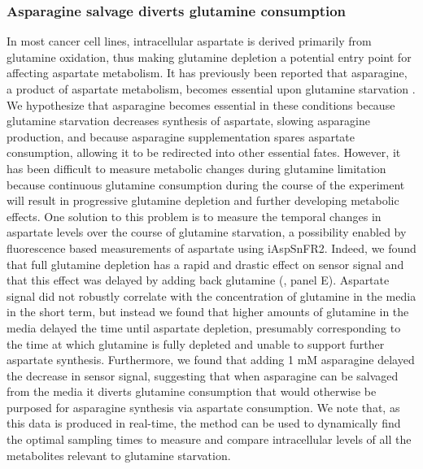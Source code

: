 \documentclass[9pt,lineno]{elife}
\begin{document}
\subsubsection{Asparagine salvage diverts glutamine consumption}
In most cancer cell lines, intracellular aspartate is derived primarily from glutamine oxidation, thus making glutamine depletion a potential entry point for affecting aspartate metabolism.
It has previously been reported that asparagine, a product of aspartate metabolism, becomes essential upon glutamine starvation \citep{Pavlova2018-nl, Zhang2014-zz}.
We hypothesize that asparagine becomes essential in these conditions because glutamine starvation decreases synthesis of aspartate, slowing asparagine production, and because asparagine supplementation spares aspartate consumption, allowing it to be redirected into other essential fates.
However, it has been difficult to measure metabolic changes during glutamine limitation because continuous glutamine consumption during the course of the experiment will result in progressive glutamine depletion and further developing metabolic effects.
One solution to this problem is to measure the temporal changes in aspartate levels over the course of glutamine starvation, a possibility enabled by fluorescence based measurements of aspartate using iAspSnFR2.
Indeed, we found that full glutamine depletion has a rapid and drastic effect on sensor signal and that this effect was delayed by adding back glutamine (, panel E).
Aspartate signal did not robustly correlate with the concentration of glutamine in the media in the short term, but instead we found that higher amounts of glutamine in the media delayed the time until aspartate depletion, presumably corresponding to the time at which glutamine is fully depleted and unable to support further aspartate synthesis.
Furthermore, we found that adding 1 mM asparagine delayed the decrease in sensor signal, suggesting that when asparagine can be salvaged from the media it diverts glutamine consumption that would otherwise be purposed for asparagine synthesis via aspartate consumption.
We note that, as this data is produced in real-time, the method can be used to dynamically find the optimal sampling times to measure and compare intracellular levels of all the metabolites relevant to glutamine starvation.
\end{document}
